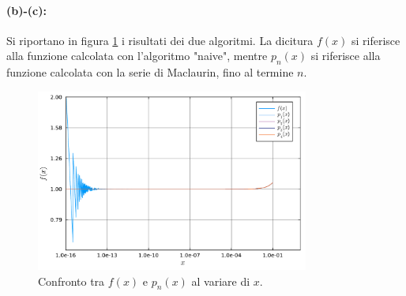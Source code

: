 \documentclass[letterpaper, 12pt]{article}
\begin{document}
\paragraph{(b)-(c): } Si riportano in figura \ref{fig:es1_4_2_1} i risultati dei due algoritmi. La dicitura $f(x)$ 
si riferisce alla funzione calcolata con l'algoritmo "naive", mentre $p_n(x)$ si riferisce alla funzione calcolata 
con la serie di Maclaurin, fino al termine $n$.

\begin{figure}[!ht]
    \centering
    \includegraphics[width=0.8\textwidth]{1421.pdf}
    \caption{Confronto tra $f(x)$ e $p_n(x)$ al variare di $x$.}
    \label{fig:es1_4_2_1}
\end{figure}
\end{document}
